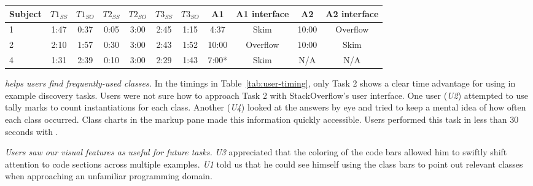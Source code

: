 \begin{table*}[t]
  \centering
  \begin{tabular}{|l|c|c|c|c|c|c|c|c|c|c|}
    \hline
    Subject & $T1_{SS}$ & $T1_{SO}$ & $T2_{SS}$ & $T2_{SO}$ & $T3_{SS}$ & $T3_{SO}$ & A1 & A1 interface & A2 & A2 interface \\
    \hline
    1 & 1:47 & 0:37 & 0:05 & 3:00 & 2:45 & 1:15 & 4:37 & Skim & 10:00 & Overflow \\
    \hline
    2 & 2:10 & 1:57 & 0:30 & 3:00 & 2:43 & 1:52 & 10:00 & Overflow & 10:00 & Skim \\
    \hline
    4 & 1:31 & 2:39 & 0:10 & 3:00 & 2:29 & 1:43 & 7:00* & Skim & N/A & N/A \\
    \hline
  \end{tabular}
  \caption{Times recorded for performing code discovery and programming tasks.
  Each task was performed once with \systemname{} (\emph{SS}) and once with static StackOverflow search results (\emph{SO}).
  Users were clearly able to discover the most common classes used in examples much more quicky using \systemname{} (\emph{T2}).
  However, we believe that unfamiliarity of search paradigm and interface resulted in no improvement over the baseline in the other tasks.
  \emph{U3} was not able to particpate in these tasks.\newline
  * \emph{U4} was given a time limit of 7:00 for the final task instead of the 10:00 prescribed for the other users.}
  \label{tab:user-timing}
\end{table*}

\emph{\systemname{} helps users find frequently-used classes.}
In the timings in Table~\ref{tab:user-timing}, only Task 2 shows a clear time advantage for using \systemname{} in example discovery tasks.
Users were not sure how to approach Task 2 with StackOverflow's user interface.
One user (\emph{U2}) attempted to use tally marks to count instantiations for each class.
Another (\emph{U4}) looked at the answers by eye and tried to keep a mental idea of how often each class occurred.
Class charts in the markup pane made this information quickly accessible.
Users performed this task in less than 30 seconds with \systemname{}.

\emph{Users saw our visual features as useful for future tasks.}
\emph{U3} appreciated that the coloring of the code bars allowed him to swiftly shift attention to code sections across multiple examples.
\emph{U1} told us that he could see himself using the class bars to point out relevant classes when approaching an unfamiliar programming domain.

